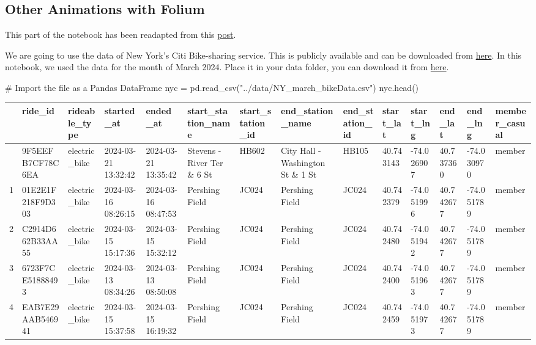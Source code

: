 \documentclass[
  letterpaper,
  DIV=11,
  numbers=noendperiod]{scrreprt}
\newenvironment{Shaded}{\begin{snugshade}}{\end{snugshade}}
\newcommand{\CommentTok}[1]{\textcolor[rgb]{0.37,0.37,0.37}{#1}}
\newcommand{\NormalTok}[1]{\textcolor[rgb]{0.00,0.23,0.31}{#1}}
\newcommand{\OperatorTok}[1]{\textcolor[rgb]{0.37,0.37,0.37}{#1}}
\newcommand{\StringTok}[1]{\textcolor[rgb]{0.13,0.47,0.30}{#1}}
\begin{document}
\subsection{Other Animations with
Folium}\label{other-animations-with-folium}

This part of the notebook has been readapted from this
\href{https://www.linkedin.com/pulse/visualizing-nyc-bike-data-interactive-animated-maps-folium-toso/}{post}.

We are going to use the data of New York's Citi Bike-sharing service.
This is publicly available and can be downloaded from
\href{https://s3.amazonaws.com/tripdata/index.html}{here}. In this
notebook, we used the data for the month of March 2024. Place it in your
data folder, you can download it from
\href{https://github.com/GDSL-UL/wma/blob/main/data/NY_march_bikeData.csv}{here}.

\begin{Shaded}
\begin{Highlighting}[]
\CommentTok{\# Import the file as a Pandas DataFrame}
\NormalTok{nyc }\OperatorTok{=}\NormalTok{ pd.read\_csv(}\StringTok{"../data/NY\_march\_bikeData.csv"}\NormalTok{)}
\NormalTok{nyc.head()}
\end{Highlighting}
\end{Shaded}

\begin{longtable}[]{@{}llllllllllllll@{}}
\toprule\noalign{}
& ride\_id & rideable\_type & started\_at & ended\_at &
start\_station\_name & start\_station\_id & end\_station\_name &
end\_station\_id & start\_lat & start\_lng & end\_lat & end\_lng &
member\_casual \\
\midrule\noalign{}
\endhead
\bottomrule\noalign{}
\endlastfoot
0 & 9F5EEFB7CF78C6EA & electric\_bike & 2024-03-21 13:32:42 & 2024-03-21
13:35:42 & Stevens - River Ter \& 6 St & HB602 & City Hall - Washington
St \& 1 St & HB105 & 40.743143 & -74.026907 & 40.737360 & -74.030970 &
member \\
1 & 01E2E1F218F9D303 & electric\_bike & 2024-03-16 08:26:15 & 2024-03-16
08:47:53 & Pershing Field & JC024 & Pershing Field & JC024 & 40.742379 &
-74.051996 & 40.742677 & -74.051789 & member \\
2 & C2914D662B33AA55 & electric\_bike & 2024-03-15 15:17:36 & 2024-03-15
15:32:12 & Pershing Field & JC024 & Pershing Field & JC024 & 40.742480 &
-74.051942 & 40.742677 & -74.051789 & member \\
3 & 6723F7CE51888493 & electric\_bike & 2024-03-13 08:34:26 & 2024-03-13
08:50:08 & Pershing Field & JC024 & Pershing Field & JC024 & 40.742400 &
-74.051963 & 40.742677 & -74.051789 & member \\
4 & EAB7E29AAB546941 & electric\_bike & 2024-03-15 15:37:58 & 2024-03-15
16:19:32 & Pershing Field & JC024 & Pershing Field & JC024 & 40.742459 &
-74.051973 & 40.742677 & -74.051789 & member \\
\end{longtable}
\end{document}
